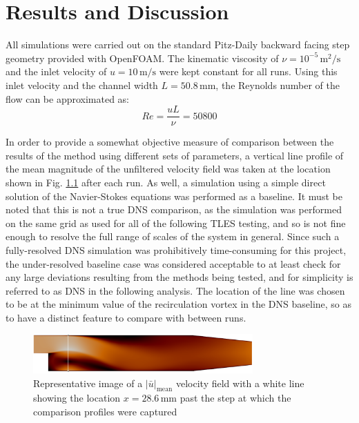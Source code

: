 \chapter{Results and Discussion}


All simulations were carried out on the standard Pitz-Daily backward facing step geometry provided with OpenFOAM. The kinematic viscosity of $\nu=10^{-5}\,\mathrm{m}^2/\mathrm{s}$ and the inlet velocity of $u=10\,\mathrm{m}/\mathrm{s}$ were kept constant for all runs. Using this inlet velocity and the channel width $L=50.8\,\mathrm{mm}$, the Reynolds number of the flow can be approximated as: $$ Re=\frac{uL}{\nu}=50800$$

In order to provide a somewhat objective measure of comparison between the results of the method using different sets of parameters, a vertical line profile of the mean magnitude of the unfiltered velocity field was taken at the location shown in Fig. \ref{fig:line_location} after each run. As well, a simulation using a simple direct solution of the Navier-Stokes equations was performed as a baseline. It must be noted that this is not a true DNS comparison, as the simulation was performed on the same grid as used for all of the following TLES testing, and so is not fine enough to resolve the full range of scales of the system in general. Since such a fully-resolved DNS simulation was prohibitively time-consuming for this project, the under-resolved baseline case was considered acceptable to at least check for any large deviations resulting from the methods being tested, and for simplicity is referred to as DNS in the following analysis. The location of the line was chosen to be at the minimum value of the recirculation vortex in the DNS baseline, so as to have a distinct feature to compare with between runs.

\begin{figure}[!b]
\centering
\includegraphics[width=0.75\textwidth]{figures/line_location.pdf}
\caption{Representative image of a $|\bar{u}|_{\mathrm{mean}}$ velocity field with a white line showing the location $x=28.6\,\mathrm{mm}$ past the step at which the comparison profiles were captured}
\label{fig:line_location}
\end{figure}


